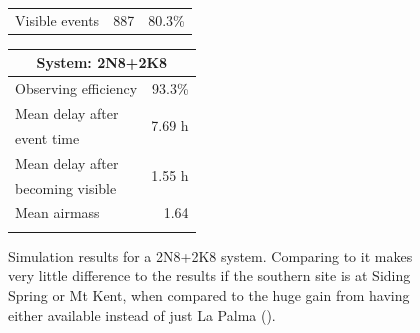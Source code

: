 \begin{colsection}
\begin{figure}[p]
\begin{center}
\begin{minipage}[t]{0.45\linewidth}
\begin{tabular}{lrr}
                \midrule
                Visible events & 887 &  80.3\% \\
            \end{tabular}
        \end{minipage}
        \begin{minipage}[t]{0.37\linewidth}\vspace{0pt}
            \begin{tabular}{lr}
                \multicolumn{2}{c}{\textbf{System: 2N8+2K8}} \\
                \midrule
                Observing efficiency & 93.3\% \\
                \midrule
                Mean delay after     & \multirow{2}{*}{7.69 h} \\
                event time           & \\
                Mean delay after     & \multirow{2}{*}{1.55 h} \\
                becoming visible     & \\
                \midrule
                Mean airmass         & 1.64 \\
                & \\
            \end{tabular}
        \end{minipage}
    \end{center}
    \caption[GW simulation results: 2N8+2K8 system]{
        Simulation results for a 2N8+2K8 system. Comparing to  it makes very little difference to the results if the southern site is at Siding Spring or Mt Kent, when compared to the huge gain from having either available instead of just La Palma ().
    }\label{fig:gw_sim_2n8+2k8}
\end{figure}


\end{colsection}
